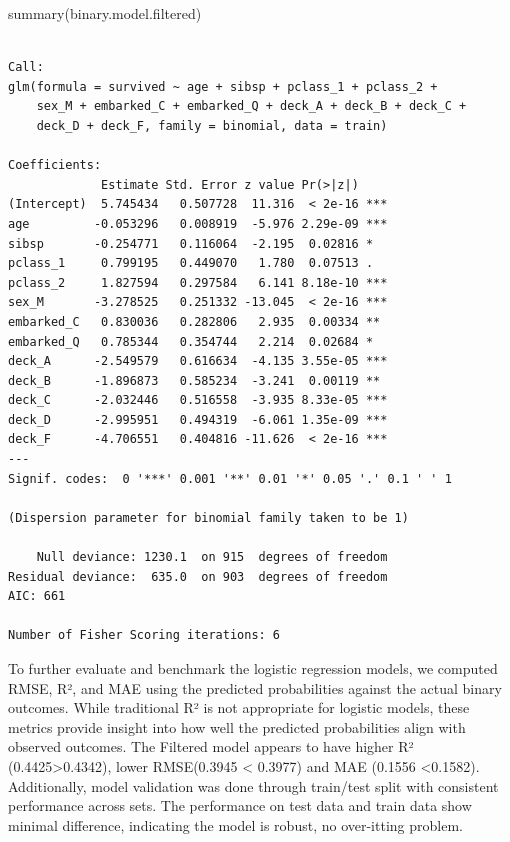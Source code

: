 \documentclass[
  letterpaper,
  DIV=11,
  numbers=noendperiod]{scrartcl}
\newenvironment{Shaded}{\begin{snugshade}}{\end{snugshade}}
\newcommand{\FunctionTok}[1]{\textcolor[rgb]{0.28,0.35,0.67}{#1}}
\newcommand{\NormalTok}[1]{\textcolor[rgb]{0.00,0.23,0.31}{#1}}
\begin{document}
\begin{Shaded}
\begin{Highlighting}[]
\FunctionTok{summary}\NormalTok{(binary.model.filtered)}
\end{Highlighting}
\end{Shaded}

\begin{verbatim}

Call:
glm(formula = survived ~ age + sibsp + pclass_1 + pclass_2 + 
    sex_M + embarked_C + embarked_Q + deck_A + deck_B + deck_C + 
    deck_D + deck_F, family = binomial, data = train)

Coefficients:
             Estimate Std. Error z value Pr(>|z|)    
(Intercept)  5.745434   0.507728  11.316  < 2e-16 ***
age         -0.053296   0.008919  -5.976 2.29e-09 ***
sibsp       -0.254771   0.116064  -2.195  0.02816 *  
pclass_1     0.799195   0.449070   1.780  0.07513 .  
pclass_2     1.827594   0.297584   6.141 8.18e-10 ***
sex_M       -3.278525   0.251332 -13.045  < 2e-16 ***
embarked_C   0.830036   0.282806   2.935  0.00334 ** 
embarked_Q   0.785344   0.354744   2.214  0.02684 *  
deck_A      -2.549579   0.616634  -4.135 3.55e-05 ***
deck_B      -1.896873   0.585234  -3.241  0.00119 ** 
deck_C      -2.032446   0.516558  -3.935 8.33e-05 ***
deck_D      -2.995951   0.494319  -6.061 1.35e-09 ***
deck_F      -4.706551   0.404816 -11.626  < 2e-16 ***
---
Signif. codes:  0 '***' 0.001 '**' 0.01 '*' 0.05 '.' 0.1 ' ' 1

(Dispersion parameter for binomial family taken to be 1)

    Null deviance: 1230.1  on 915  degrees of freedom
Residual deviance:  635.0  on 903  degrees of freedom
AIC: 661

Number of Fisher Scoring iterations: 6
\end{verbatim}

To further evaluate and benchmark the logistic regression models, we
computed RMSE, R², and MAE using the predicted probabilities against the
actual binary outcomes. While traditional R² is not appropriate for
logistic models, these metrics provide insight into how well the
predicted probabilities align with observed outcomes. The Filtered model
appears to have higher R² (0.4425\textgreater0.4342), lower RMSE(0.3945
\textless{} 0.3977) and MAE (0.1556 \textless0.1582). Additionally,
model validation was done through train/test split with consistent
performance across sets. The performance on test data and train data
show minimal difference, indicating the model is robust, no over-itting
problem.
\end{document}
